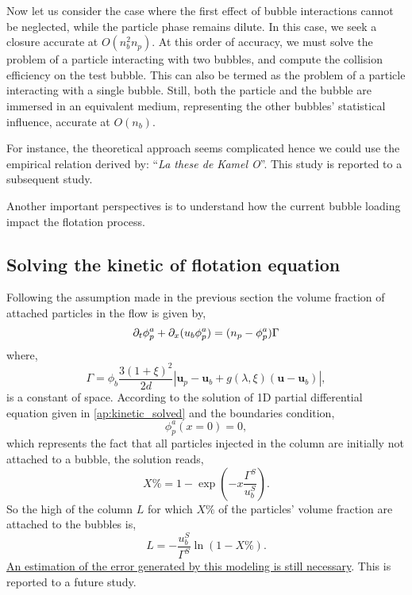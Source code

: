 Now let us consider the case where the first effect of bubble interactions cannot be neglected, while the particle phase remains dilute. 
In this case, we seek a closure accurate at $O(n_b^2n_p)$. 
At this order of accuracy, we must solve the problem of a particle interacting with two bubbles, and compute the collision efficiency on the test bubble. 
This can also be termed as the problem of a particle interacting with a single bubble. Still, both the particle and the bubble are immersed in an equivalent medium, representing the other bubbles' statistical influence, accurate at $O(n_b)$. 

For instance, the theoretical approach seems complicated hence we could use the empirical relation derived by: ``\textit{La these de Kamel O}''. 
This study is reported to a subsequent study. 

Another important perspectives is to understand how the current bubble loading impact the flotation process. 

\subsection{Solving the kinetic of flotation equation}

Following the assumption made in the previous section the volume fraction of attached particles in the flow is given by,
\begin{equation}
    \partial_t \phi_p^a  
    + \partial_x (u_b \phi_p^a)
    =
    (n_p - \phi_p^a)\Gamma
\end{equation}
where, 
\begin{equation}
    \Gamma = \phi_b \frac{3(1+\xi)^2 }{2d}
    \left|\textbf{u}_p  - \textbf{u}_b + g(\lambda,\xi) (\textbf{u} - \textbf{u}_b)\right|,
\end{equation}
is a constant of space. 
According to the solution of 1D partial differential equation given in \ref{ap:kinetic_solved} and the boundaries condition,
\begin{equation}
    \phi_p^a(x=0) = 0,
\end{equation} 
which represents the fact that all particles injected in the column are initially not attached to a bubble, 
the solution reads,
\begin{equation}
    X\% =
    1-\exp\left(-x \frac{\Gamma^S}{u_b^S} \right).
\end{equation}
So the high of the column $L$ for which $X\%$ of the particles' volume fraction are attached to the bubbles is, 
\begin{equation}
    L = - \frac{u_b^S}{\Gamma^S}
    \ln(1 - X\%). 
\end{equation}
\underline{An estimation of the error generated by this modeling is still necessary}.
This is reported to a future study.  

